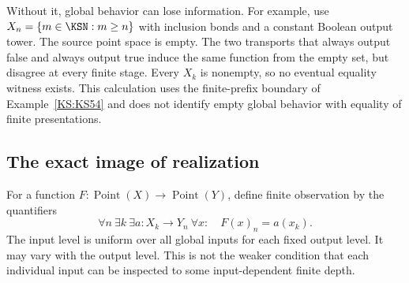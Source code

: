 Without it, global behavior can lose information. For example, use \(X_n=\{m\in\KSN:m\ge n\}\) with inclusion bonds and a constant Boolean output tower. The source point space is empty. The two transports that always output false and always output true induce the same function from the empty set, but disagree at every finite stage. Every \(X_k\) is nonempty, so no eventual equality witness exists. This calculation uses the finite-prefix boundary of Example~\ref{KS:KS54} and does not identify empty global behavior with equality of finite presentations.

\subsection{The exact image of realization}
For a function \(F:\operatorname{Point}(X)\to\operatorname{Point}(Y)\), define finite observation by the quantifiers
\begin{equation}\label{KS:eq:finite-observation}
 \forall n\ \exists k\ \exists a:X_k\to Y_n\ \forall x:\quad
 F(x)_n=a(x_k).
\end{equation}
The input level is uniform over all global inputs for each fixed output level. It may vary with the output level. This is not the weaker condition that each individual input can be inspected to some input-dependent finite depth.

